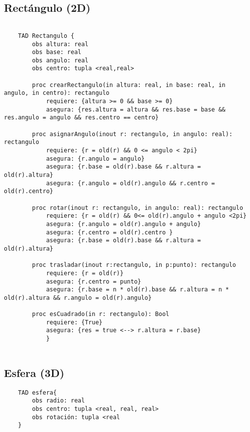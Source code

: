 \documentclass[10pt,a4paper]{article}
\begin{document}
\subsection{Rectángulo (2D)}
\begin{lstlisting}
 
    TAD Rectangulo {
        obs altura: real
        obs base: real
        obs angulo: real
        obs centro: tupla <real,real>

        proc crearRectangulo(in altura: real, in base: real, in angulo, in centro): rectangulo
            requiere: {altura >= 0 && base >= 0}
            asegura: {res.altura = altura && res.base = base && res.angulo = angulo && res.centro == centro}
    
        proc asignarAngulo(inout r: rectangulo, in angulo: real): rectangulo
            requiere: {r = old(r) && 0 <= angulo < 2pi}
            asegura: {r.angulo = angulo}
            asegura: {r.base = old(r).base && r.altura = old(r).altura}
            asegura: {r.angulo = old(r).angulo && r.centro = old(r).centro}

        proc rotar(inout r: rectangulo, in angulo: real): rectangulo
            requiere: {r = old(r) && 0<= old(r).angulo + angulo <2pi}
            asegura: {r.angulo = old(r).angulo + angulo}
            asegura: {r.centro = old(r).centro }
            asegura: {r.base = old(r).base && r.altura = old(r).altura}
    
        proc trasladar(inout r:rectangulo, in p:punto): rectangulo
            requiere: {r = old(r)}
            asegura: {r.centro = punto}
            asegura: {r.base = n * old(r).base && r.altura = n * old(r).altura && r.angulo = old(r).angulo}
    
        proc esCuadrado(in r: rectangulo): Bool
            requiere: {True}
            asegura: {res = true <--> r.altura = r.base}
            } 
          
\end{lstlisting}
\subsection{Esfera (3D)}
\begin{lstlisting}
    TAD esfera{
        obs radio: real
        obs centro: tupla <real, real, real>
        obs rotación: tupla <real
    }
\end{lstlisting}
\end{document}
